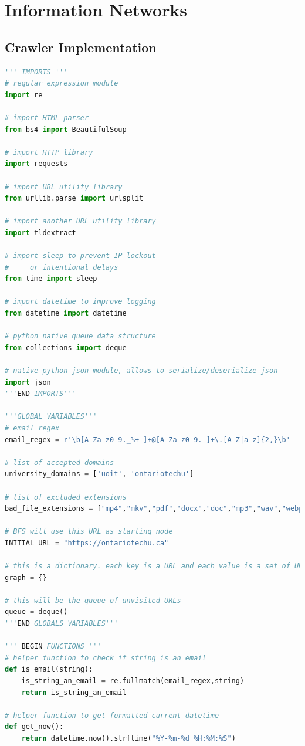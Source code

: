 \section{Information Networks}

\subsection{Crawler Implementation}
\begin{lstlisting}[language=Python]
''' IMPORTS '''
# regular expression module
import re

# import HTML parser
from bs4 import BeautifulSoup

# import HTTP library
import requests

# import URL utility library
from urllib.parse import urlsplit

# import another URL utility library
import tldextract

# import sleep to prevent IP lockout
#     or intentional delays
from time import sleep

# import datetime to improve logging
from datetime import datetime

# python native queue data structure
from collections import deque

# native python json module, allows to serialize/deserialize json
import json
'''END IMPORTS'''

'''GLOBAL VARIABLES'''
# email regex
email_regex = r'\b[A-Za-z0-9._%+-]+@[A-Za-z0-9.-]+\.[A-Z|a-z]{2,}\b'

# list of accepted domains
university_domains = ['uoit', 'ontariotechu']

# list of excluded extensions
bad_file_extensions = ["mp4","mkv","pdf","docx","doc","mp3","wav","webp", "jpg", "png"]

# BFS will use this URL as starting node
INITIAL_URL = "https://ontariotechu.ca"

# this is a dictionary. each key is a URL and each value is a set of URLs that are referenced by the key
graph = {}

# this will be the queue of unvisited URLs
queue = deque()
'''END GLOBALS VARIABLES'''

''' BEGIN FUNCTIONS '''
# helper function to check if string is an email
def is_email(string):
    is_string_an_email = re.fullmatch(email_regex,string)
    return is_string_an_email

# helper function to get formatted current datetime
def get_now():
    return datetime.now().strftime("%Y-%m-%d %H:%M:%S")


\end{lstlisting}
